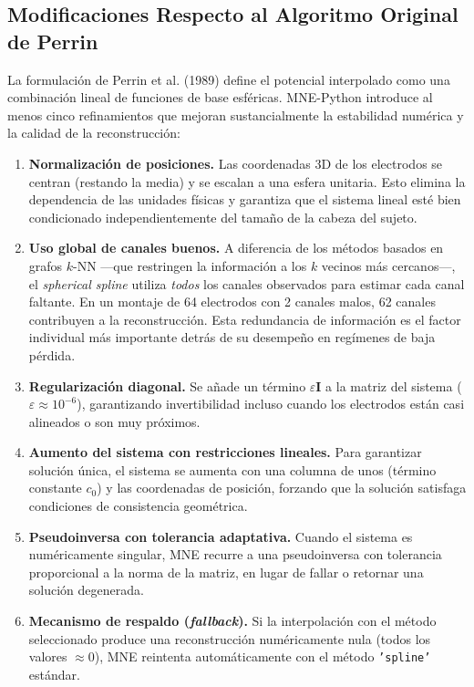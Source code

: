 \subsection{Modificaciones Respecto al Algoritmo Original de Perrin}

La formulación de Perrin et al. (1989) define el potencial interpolado como una combinación lineal de funciones de base esféricas. MNE-Python introduce al menos cinco refinamientos que mejoran sustancialmente la estabilidad numérica y la calidad de la reconstrucción:

\begin{enumerate}
    \item \textbf{Normalización de posiciones.} Las coordenadas 3D de los electrodos se centran (restando la media) y se escalan a una esfera unitaria. Esto elimina la dependencia de las unidades físicas y garantiza que el sistema lineal esté bien condicionado independientemente del tamaño de la cabeza del sujeto.

    \item \textbf{Uso global de canales buenos.} A diferencia de los métodos basados en grafos $k$-NN —que restringen la información a los $k$ vecinos más cercanos—, el \textit{spherical spline} utiliza \textit{todos} los canales observados para estimar cada canal faltante. En un montaje de 64 electrodos con 2 canales malos, 62 canales contribuyen a la reconstrucción. Esta redundancia de información es el factor individual más importante detrás de su desempeño en regímenes de baja pérdida.

    \item \textbf{Regularización diagonal.} Se añade un término $\varepsilon \mathbf{I}$ a la matriz del sistema ($\varepsilon \approx 10^{-6}$), garantizando invertibilidad incluso cuando los electrodos están casi alineados o son muy próximos.

    \item \textbf{Aumento del sistema con restricciones lineales.} Para garantizar solución única, el sistema se aumenta con una columna de unos (término constante $c_0$) y las coordenadas de posición, forzando que la solución satisfaga condiciones de consistencia geométrica.

    \item \textbf{Pseudoinversa con tolerancia adaptativa.} Cuando el sistema es numéricamente singular, MNE recurre a una pseudoinversa con tolerancia proporcional a la norma de la matriz, en lugar de fallar o retornar una solución degenerada.

    \item \textbf{Mecanismo de respaldo (\textit{fallback}).} Si la interpolación con el método seleccionado produce una reconstrucción numéricamente nula (todos los valores $\approx 0$), MNE reintenta automáticamente con el método \texttt{'spline'} estándar.
\end{enumerate}

